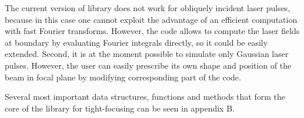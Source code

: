 The current version of library does not work for obliquely incident laser pulses, because in this case one cannot exploit the advantage of an efficient computation with fast Fourier transforms. However, the code allows to compute the laser fields at boundary by evaluating Fourier integrals directly, so it could be easily extended. Second, it is at the moment possible to simulate only Gaussian laser pulses. However, the user can easily prescribe its own shape and position of the beam in focal plane by modifying corresponding part of the code.

Several most important data structures, functions and methods that form the core of the library for tight-focusing can be seen in appendix B.